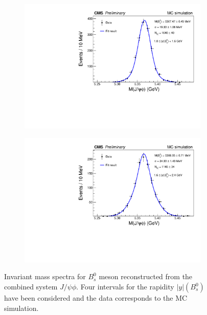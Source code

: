 \begin{figure}
\begin{subfigure}[b]{0.475\textwidth}
		\includegraphics[width=\textwidth]{MainContent/Figs/mass/mass_BsFitMC_best1_ybins_1.0_1.6.PDF}
		\caption{}
	\end{subfigure}
	\hfill
	\begin{subfigure}[b]{0.475\textwidth}
		\centering
		\includegraphics[width=\textwidth]{MainContent/Figs/mass/mass_BsFitMC_best1_ybins_1.6_2.4.PDF}
		\caption{}%
	\end{subfigure}
	\caption{Invariant mass spectra for $B^0_s$ meson reconstructed from the combined system $J/\psi \phi$. Four intervals for the rapidity $|y|(B^0_s)$ have been considered and the data corresponds to the MC simulation.}
	\label{fig:massMC_ybins}
\end{figure}

